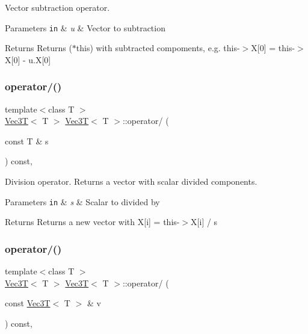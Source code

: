 Vector subtraction operator. 


\begin{DoxyParams}[1]{Parameters}
\mbox{\tt in}  & {\em u} & Vector to subtraction \\
\hline
\end{DoxyParams}
\begin{DoxyReturn}{Returns}
Returns ($\ast$this) with subtracted compoments, e.\+g. this-\/$>$X\mbox{[}0\mbox{]} = this-\/$>$X\mbox{[}0\mbox{]} -\/ u.\+X\mbox{[}0\mbox{]} 
\end{DoxyReturn}
\mbox{\label{classVec3T_acc5973c1c82e51c597b47ba39870f528}} 
\subsubsection{\texorpdfstring{operator/()}{operator/()}\hspace{0.1cm}{\footnotesize\ttfamily [1/2]}}
{\footnotesize\ttfamily template$<$class T $>$ \\
\hyperlink{classVec3T}{Vec3T}$<$ T $>$ \hyperlink{classVec3T}{Vec3T}$<$ T $>$\+::operator/ (\begin{DoxyParamCaption}\item[{const T \&}]{s }\end{DoxyParamCaption}) const\hspace{0.3cm}{\ttfamily [inline]}, {\ttfamily [noexcept]}}



Division operator. Returns a vector with scalar divided components. 


\begin{DoxyParams}[1]{Parameters}
\mbox{\tt in}  & {\em s} & Scalar to divided by \\
\hline
\end{DoxyParams}
\begin{DoxyReturn}{Returns}
Returns a new vector with X\mbox{[}i\mbox{]} = this-\/$>$X\mbox{[}i\mbox{]} / s 
\end{DoxyReturn}
\mbox{\label{classVec3T_a3c48111d27fb16cc3304e7aa2b4603fc}} 
\subsubsection{\texorpdfstring{operator/()}{operator/()}\hspace{0.1cm}{\footnotesize\ttfamily [2/2]}}
{\footnotesize\ttfamily template$<$class T $>$ \\
\hyperlink{classVec3T}{Vec3T}$<$ T $>$ \hyperlink{classVec3T}{Vec3T}$<$ T $>$\+::operator/ (\begin{DoxyParamCaption}\item[{const \hyperlink{classVec3T}{Vec3T}$<$ T $>$ \&}]{v }\end{DoxyParamCaption}) const\hspace{0.3cm}{\ttfamily [inline]}, {\ttfamily [noexcept]}}




